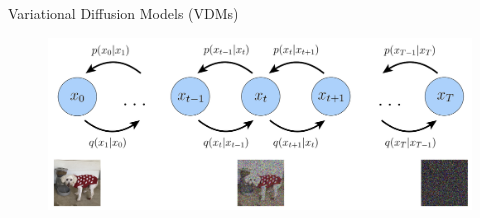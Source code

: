 \begin{frame}{Variational Diffusion Models (VDMs)}
    \begin{figure}
        \centering
        \includegraphics[width=0.9\linewidth]{images/vdm_process.png}
    \end{figure}
\end{frame}